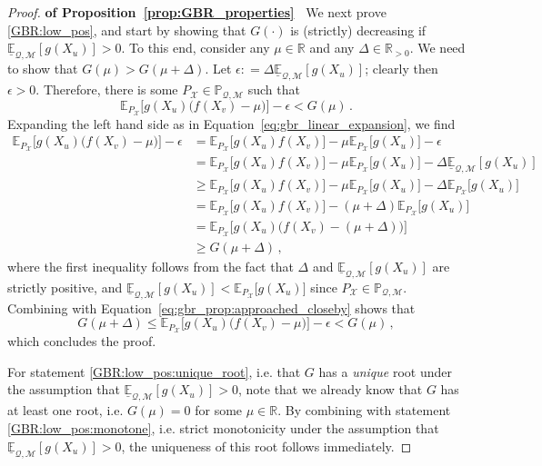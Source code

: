 \documentclass[twoside,11pt]{article}
\newcommand{\reals}{\mathbb{R}}
\newcommand{\realspos}{\reals_{>0}}
\newcommand{\states}{\mathcal{X}}
\newcommand{\lexp}{\underline{\mathbb{E}}_{\rateset,\mathcal{M}}}
\newcommand{\rateset}{\mathcal{Q}}
\newcommand{\coloneqq}{:\!=}
\begin{document}
\begin{proof}{\bf of Proposition~\ref{prop:GBR_properties}~}
We next prove \ref{GBR:low_pos}, and start by showing that $G(\cdot)$ is (strictly) decreasing if $\lexp[g(X_u)]>0$. To this end, consider any $\mu\in\reals$ and any $\Delta\in\realspos$. We need to show that $G(\mu)>G(\mu+\Delta)$. Let $\epsilon\coloneqq \Delta \lexp[g(X_u)]$; clearly then $\epsilon>0$. Therefore, there is some $P_\states\in\mathbb{P}_{\rateset,\mathcal{M}}$ such that
\begin{equation}\label{eq:gbr_prop:approached_closeby}
\mathbb{E}_{P_\states}\bigl[g(X_u)\bigl(f(X_v)-\mu\bigr)\bigr] - \epsilon < G(\mu)\,.
\end{equation}
Expanding the left hand side as in Equation~\eqref{eq:gbr_linear_expansion}, we find
\begin{align*}
\mathbb{E}_{P_\states}\bigl[g(X_u)\bigl(f(X_v)-\mu\bigr)\bigr] - \epsilon &= \mathbb{E}_{P_\states}\bigl[g(X_u)f(X_v)\bigr] - \mu \mathbb{E}_{P_\states}\bigl[g(X_u)\bigr] - \epsilon \\
 &= \mathbb{E}_{P_\states}\bigl[g(X_u)f(X_v)\bigr] - \mu \mathbb{E}_{P_\states}\bigl[g(X_u)\bigr] - \Delta\lexp[g(X_u)] \\
 &\geq \mathbb{E}_{P_\states}\bigl[g(X_u)f(X_v)\bigr] - \mu \mathbb{E}_{P_\states}\bigl[g(X_u)\bigr] - \Delta\mathbb{E}_{P_\states}\bigl[g(X_u)\bigr] \\
 &= \mathbb{E}_{P_\states}\bigl[g(X_u)f(X_v)\bigr] - (\mu+\Delta) \mathbb{E}_{P_\states}\bigl[g(X_u)\bigr] \\
 &= \mathbb{E}_{P_\states}\bigl[g(X_u)\bigl(f(X_v)-(\mu+\Delta)\bigr)\bigr] \\
 &\geq G(\mu+\Delta)\,,
\end{align*}
where the first inequality follows from the fact that $\Delta$ and $\lexp[g(X_u)]$ are strictly positive, and $\lexp[g(X_u)]<\mathbb{E}_{P_\states}\bigl[g(X_u)\bigr]$ since $P_\states\in\mathbb{P}_{\rateset,\mathcal{M}}$. Combining with Equation~\eqref{eq:gbr_prop:approached_closeby} shows that
\begin{equation*}
G(\mu+\Delta) \leq \mathbb{E}_{P_\states}\bigl[g(X_u)\bigl(f(X_v)-\mu\bigr)\bigr] - \epsilon < G(\mu)\,,
\end{equation*}
which concludes the proof.

For statement \ref{GBR:low_pos:unique_root}, i.e. that $G$ has a \emph{unique} root under the assumption that $\lexp[g(X_u)]>0$, note that we already know that $G$ has at least one root, i.e. $G(\mu)=0$ for some $\mu\in\reals$. By combining with statement \ref{GBR:low_pos:monotone}, i.e. strict monotonicity under the assumption that $\lexp[g(X_u)]>0$, the uniqueness of this root follows immediately.


\end{proof}
\end{document}
